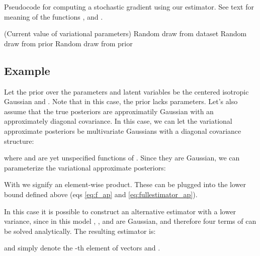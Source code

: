 \documentclass{article} \usepackage{nips13submit_e,times}
\theoremstyle{definition}
\theoremstyle{definition}
\begin{document}
\begin{algorithm}[t]
\caption{Pseudocode for computing a stochastic gradient using our estimator. See text for meaning of the functions ,  and . }
\renewcommand{\algorithmicforall}{\textbf{for each}}
\begin{algorithmic}
\Require  (Current value of variational parameters)
\State 
{}
\State  Random draw from dataset 
\State  Random draw from prior 
\State  Random draw from prior 
\State 
\EndFor \\
\Return 
\end{algorithmic}
\label{algorithm_ap}
\end{algorithm}

\subsection{Example}
Let the prior over the parameters and latent variables be the centered isotropic Gaussian  and . Note that in this case, the prior lacks parameters. Let's also assume that the true posteriors are approximatily Gaussian with an approximately diagonal covariance. In this case, we can let the variational approximate posteriors be multivariate Gaussians with a diagonal covariance structure:

where  and  are yet unspecified functions of .
Since they are Gaussian, we can parameterize the variational approximate posteriors:

With  we signify an element-wise product. These can be plugged into the lower bound defined above (eqs \eqref{eq:f_ap} and \eqref{eq:fullestimator_ap}).

In this case it is possible to construct an alternative estimator with a lower variance, since in this model ,  ,  and  are Gaussian, and therefore four terms of  can be solved analytically. The resulting estimator is:

 and  simply denote the -th element of vectors  and .


 
\end{document}
